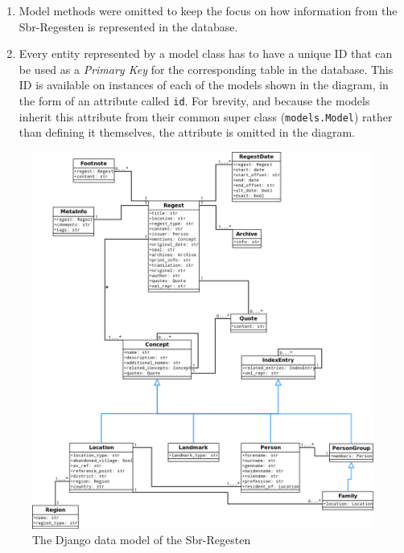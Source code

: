 \begin{enumerate}
\item Model methods were omitted to keep the focus on how information
  from the Sbr-Regesten is represented in the database.
\item Every entity represented by a model class has to have a unique
  ID that can be used as a \emph{Primary Key} for the corresponding
  table in the database. This ID is available on instances of each of
  the models shown in the diagram, in the form of an attribute called
  \texttt{id}. For brevity, and because the models inherit this
  attribute from their common super class (\texttt{models.Model})
  rather than defining it themselves, the attribute is omitted in the
  diagram.
\end{enumerate}

\begin{figure}[H]
  \centering
  \includegraphics[scale=0.4]{img/data-model}
  \caption{The Django data model of the Sbr-Regesten}
  \label{fig:data-model}
\end{figure}

